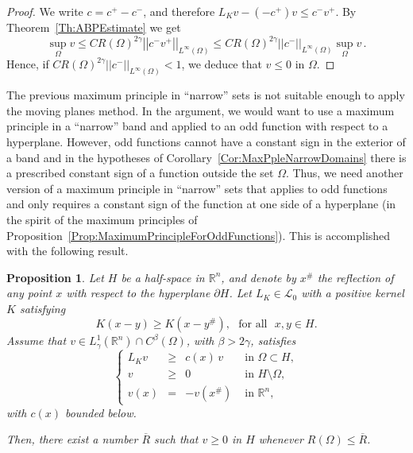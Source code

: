 \documentclass[12pt,reqno]{amsart}
\newtheorem{proposition}[theorem]{Proposition}
\theoremstyle{definition}
\theoremstyle{remark}
\newcommand{\con}[1]{\mathbb{#1}}
\newcommand{\R}{\con{R}} %
\newcommand{\lcal}{\mathcal{L}}
\newcommand{\norm}[1]{\left | \left |{#1} \right | \right |}
\newcommand{\s}{\gamma}
\newcommand\beqc[1]{\left\{\begin{array}{#1}}
\newcommand\eeqc{\end{array} \right.}
\def\PDEsystem{rcll}
\numberwithin{equation}{section}
\begin{document}
\begin{proof}
	We write $c= c^+ - c^-$, and therefore $L_K v -(-c^+)v \leq c^- v^+	$. By Theorem~\ref{Th:ABPEstimate} we get
	$$
	\sup_\Omega v \leq C R(\Omega)^{2\s} \norm{c^- v^+}_{L^\infty(\Omega)} \leq C R(\Omega)^{2\s} \norm{c^-}_{L^\infty(\Omega)} \sup_\Omega v\,.
	$$
	Hence, if $C R(\Omega)^{2\s} \norm{c^-}_{L^\infty(\Omega)}  <1 $, we deduce that $v\leq 0$ in $\Omega$.
\end{proof}


The previous maximum principle in ``narrow'' sets is not suitable enough to apply the moving planes method. In the argument, we would want to use a maximum principle in a ``narrow'' band and applied to an odd function with respect to a hyperplane. However, odd functions cannot have a constant sign in the exterior of a band and in the hypotheses of Corollary~\ref{Cor:MaxPpleNarrowDomains} there is a prescribed constant sign of a function outside the set $\Omega$. Thus, we need another version of a maximum principle in ``narrow'' sets that applies to odd functions and only requires a constant sign of the function at one side of a hyperplane (in the spirit of the maximum principles of Proposition~\ref{Prop:MaximumPrincipleForOddFunctions}). This is accomplished with the following result.

\begin{proposition}
	\label{Prop:MaxPrpNarrowOdd}
	Let $H$ be a half-space in $\R^n$, and denote by $x^\#$ the reflection of any point $x$ with respect to the hyperplane $\partial H$. Let $L_K \in \lcal_0$ with a positive kernel $K$ satisfying
	\begin{equation}
	\label{Eq:KernelSymmetry}
	K(x-y) \geq K(x-y^\#), \,\,\,\,\text{for all } \,\, x,y\in H.
	\end{equation}
	Assume that $v\in L^1_\s(\R^n)\cap C^{\beta}(\Omega)$, with $\beta > 2\s$, satisfies
	$$
	\beqc{\PDEsystem}
	L_K  v &\geq& c(x)\,v  &\textrm{ in } \Omega\subset H,\\
	v &\geq& 0 &\textrm{ in } H\setminus\Omega,\\
	v(x) &=& -v(x^\#) &\textrm{ in } \R^n,
	\eeqc
	$$
	with $c(x)$ bounded below.
	
	Then, there exist a number $\overline{R}$ such that $v \geq 0$ in $H$ whenever $R(\Omega) \leq \overline{R}$.
\end{proposition}
\end{document}
